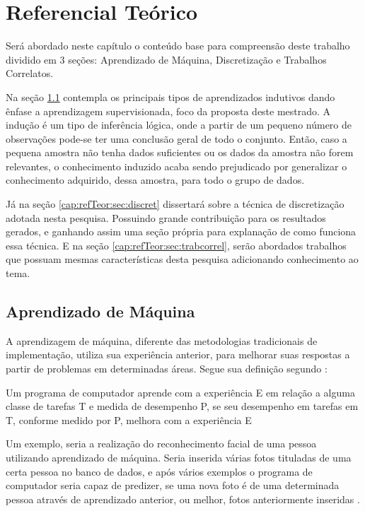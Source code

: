 \chapter{Referencial Teórico}\label{cap:refTeor}



Será abordado neste capítulo o conteúdo base para compreensão deste trabalho dividido em 3 seções: Aprendizado de Máquina, Discretização e Trabalhos Correlatos. 

Na seção \ref{cap:refTeor:sec:aprendMaq} contempla os principais tipos de aprendizados indutivos  dando ênfase a aprendizagem supervisionada, foco da proposta deste mestrado. A indução é um tipo de inferência lógica, onde a partir de um pequeno número de observações pode-se ter uma conclusão geral de todo o conjunto. Então, caso a pequena amostra não tenha dados suficientes ou os dados da amostra não forem relevantes, o conhecimento induzido acaba sendo prejudicado por generalizar o conhecimento adquirido, dessa amostra, para todo o grupo de dados.

Já na seção \ref{cap:refTeor:sec:discret} dissertará sobre a técnica de discretização adotada nesta pesquisa. Possuindo grande contribuição para os resultados gerados, e ganhando assim uma seção própria para explanação de como funciona essa técnica. E na seção \ref{cap:refTeor:sec:trabcorrel}, serão abordados trabalhos que possuam mesmas características desta pesquisa adicionando conhecimento ao tema.



\section{Aprendizado de Máquina}\label{cap:refTeor:sec:aprendMaq}

 A aprendizagem de máquina, diferente das metodologias tradicionais de implementação, utiliza sua experiência anterior, para melhorar suas respostas a partir de problemas em determinadas áreas. Segue sua definição segundo :
 
  \begin{teorema}
   Um programa de computador aprende com a experiência E em relação a alguma classe de tarefas T e medida de desempenho P, se seu desempenho em tarefas em T, conforme medido por P, melhora com a experiência E
   \label{teo:defaprendmaq}
  \end{teorema}
 
 Um exemplo, seria a realização do reconhecimento facial de uma pessoa utilizando aprendizado de máquina. Seria inserida várias fotos tituladas de uma certa pessoa no banco de dados, e após vários exemplos o programa de computador seria capaz de predizer, se uma nova foto é de uma determinada pessoa através de aprendizado  anterior, ou melhor, fotos anteriormente inseridas .

